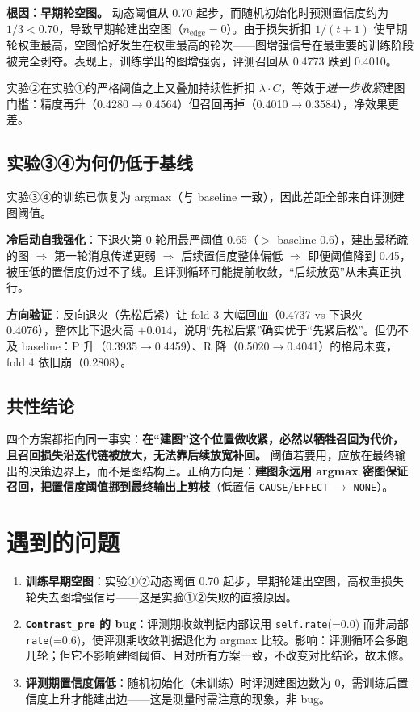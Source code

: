 \documentclass[11pt,a4paper]{ctexart}
\begin{document}
\textbf{根因：早期轮空图。} 动态阈值从 0.70 起步，而随机初始化时预测置信度约为 $1/3 < 0.70$，导致早期轮建出空图（$n_{\mathrm{edge}}=0$）。由于损失折扣 $1/(t+1)$ 使早期轮权重最高，空图恰好发生在权重最高的轮次——图增强信号在最重要的训练阶段被完全剥夺。表现上，训练学出的图增强弱，评测召回从 0.4773 跌到 0.4010。

实验②在实验①的严格阈值之上又叠加持续性折扣 $\lambda\cdot C$，等效于\emph{进一步收紧}建图门槛：精度再升（0.4280$\to$0.4564）但召回再掉（0.4010$\to$0.3584），净效果更差。

\subsection{实验③④为何仍低于基线}

实验③④的训练已恢复为 argmax（与 baseline 一致），因此差距全部来自评测建图阈值。

\textbf{冷启动自我强化}：下退火第 0 轮用最严阈值 0.65（$>$ baseline 0.6），建出最稀疏的图 $\Rightarrow$ 第一轮消息传递更弱 $\Rightarrow$ 后续置信度整体偏低 $\Rightarrow$ 即便阈值降到 0.45，被压低的置信度仍过不了线。且评测循环可能提前收敛，``后续放宽''从未真正执行。

\textbf{方向验证}：反向退火（先松后紧）让 fold 3 大幅回血（0.4737 vs 下退火 0.4076），整体比下退火高 $+0.014$，说明``先松后紧''确实优于``先紧后松''。但仍不及 baseline：P 升（0.3935$\to$0.4459）、R 降（0.5020$\to$0.4041）的格局未变，fold 4 依旧崩（0.2808）。

\subsection{共性结论}

四个方案都指向同一事实：\textbf{在``建图''这个位置做收紧，必然以牺牲召回为代价，且召回损失沿迭代链被放大，无法靠后续放宽补回。} 阈值若要用，应放在最终输出的决策边界上，而不是图结构上。正确方向是：\textbf{建图永远用 argmax 密图保证召回，把置信度阈值挪到最终输出上剪枝}（低置信 \texttt{CAUSE}/\texttt{EFFECT} $\to$ \texttt{NONE}）。

\section{遇到的问题}

\begin{enumerate}
\item \textbf{训练早期空图}：实验①②动态阈值 0.70 起步，早期轮建出空图，高权重损失轮失去图增强信号——这是实验①②失败的直接原因。
\item \textbf{\texttt{Contrast\_pre} 的 bug}：评测期收敛判据内部误用 \texttt{self.rate}(=0.0) 而非局部 \texttt{rate}(=0.6)，使评测期收敛判据退化为 argmax 比较。影响：评测循环会多跑几轮；但它不影响建图阈值、且对所有方案一致，不改变对比结论，故未修。
\item \textbf{评测期置信度偏低}：随机初始化（未训练）时评测建图边数为 0，需训练后置信度上升才能建出边——这是测量时需注意的现象，非 bug。
\end{enumerate}
\end{document}
